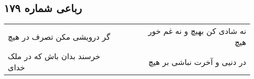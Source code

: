 \begin{center}
\section*{رباعی شماره ۱۷۹}
\label{sec:sh179}
\begin{longtable}{l p{0.5cm} r}
گر درویشی مکن تصرف در هیچ
&&
نه شادی کن بهیچ و نه غم خور هیچ
\\
خرسند بدان باش که در ملک خدای
&&
در دنیی و آخرت نباشی بر هیچ
\\
\end{longtable}
\end{center}
